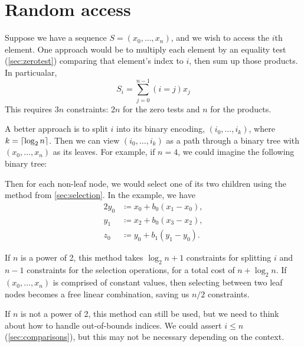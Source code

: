 \documentclass{article}
\DeclarePairedDelimiter\ceil{\lceil}{\rceil}
\begin{document}
\section{Random access}

Suppose we have a sequence $S = (x_0, \dots, x_n)$, and we wish to access the $i$th element. One approach would be to multiply each element by an equality test (\autoref{sec:zerotest}) comparing that element's index to $i$, then sum up those products. In particualar,
\begin{equation}
  S_i = \sum_{j=0}^{n-1} (i = j) x_j
\end{equation}
This requires $3n$ constraints: $2n$ for the zero tests and $n$ for the products.

A better approach is to split $i$ into its binary encoding, $(i_0, \dots, i_k)$, where $k = \ceil{\log_2 n}$. Then we can view $(i_0, \dots, i_k)$ as a path through a binary tree with $(x_0, \dots, x_n)$ as its leaves. For example, if $n = 4$, we could imagine the following binary tree:
\begin{center}
\end{center}
Then for each non-leaf node, we would select one of its two children using the method from \autoref{sec:selection}. In the example, we have
\begin{alignat}{2}
  y_0 &\coloneqq x_0 + b_0 (x_1 - x_0), \\
  y_1 &\coloneqq x_2 + b_0 (x_3 - x_2), \\
  z_0 &\coloneqq y_0 + b_1 (y_1 - y_0).
\end{alignat}

If $n$ is a power of 2, this method takes $\log_2 n + 1$ constraints for splitting $i$ and $n - 1$ constraints for the selection operations, for a total cost of $n + \log_2 n$. If $(x_0, \dots, x_n)$ is comprised of constant values, then selecting between two leaf nodes becomes a free linear combination, saving us $n / 2$ constraints.

If $n$ is not a power of 2, this method can still be used, but we need to think about how to handle out-of-bounds indices. We could assert $i \le n$ (\autoref{sec:comparisons}), but this may not be necessary depending on the context.
\end{document}
